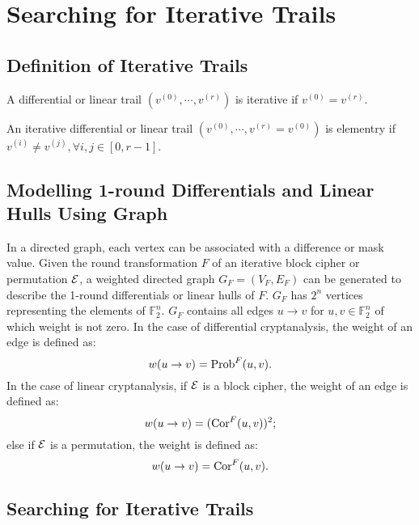 \section{Searching for Iterative Trails}

\subsection{Definition of Iterative Trails}

\begin{definition}
	A differential or linear trail $(v^{(0)},\cdots,v^{(r)})$ is iterative if $v^{(0)}=v^{(r)}$.
\end{definition}

\begin{definition}
    An iterative differential or linear trail $(v^{(0)},\cdots,v^{(r)}=v^{(0)})$ is elementry if $v^{(i)}\neq v^{(j)},\forall i,j\in [0,r-1]$.
\end{definition}

\subsection{Modelling 1-round Differentials and Linear Hulls Using Graph}

In a directed graph, each vertex can be associated with a difference or mask value. Given the round transformation $F$ of an iterative block cipher or permutation $\mathcal{E}$, a weighted directed graph $G_{F}=(V_{F},E_{F})$ can be generated to describe the 1-round differentials or linear hulls of $F$. $G_{F}$ has $2^n$ vertices representing the elements of $\mathbb{F}_2^n$. $G_{F}$ contains all edges $u\rightarrow v$ for $u,v\in \mathbb{F}_2^n$ of which weight is not zero. In the case of differential cryptanalysis, the weight of an edge is defined as:
\[
    w(u\rightarrow v)=\text{Prob}^{F}(u,v).
\]
In the case of linear cryptanalysis, if $\mathcal{E}$ is a block cipher, the weight of an edge is defined as:
\[
    w(u\rightarrow v)=(\text{Cor}^{F}(u,v))^2;
\]
else if $\mathcal{E}$ is a permutation, the weight is defined as:
\[
    w(u\rightarrow v)=\text{Cor}^{F}(u,v).
\]

\subsection{Searching for Iterative Trails\label{subsec:iterative-trails}}

